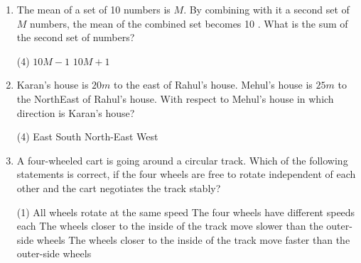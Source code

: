 \begin{enumerate}
\begin{tasks}
\end{tasks}
\item  The mean of a set of 10 numbers is $M$. By combining with it a second set of $M$ numbers, the mean of the combined set becomes 10 . What is the sum of the second set of numbers?
 \begin{tasks}(4)
	\task[\textbf{a.}]$10 M-1$
	\task[\textbf{b.}]$10 M+1$
\end{tasks}
\item Karan's house is $20 m$ to the east of Rahul's house. Mehul's house is $25 m$ to the NorthEast of Rahul's house. With respect to Mehul's house in which direction is Karan's house?
 \begin{tasks}(4)
	\task[\textbf{a.}]East
	\task[\textbf{b.}] South
	\task[\textbf{c.}]North-East
	\task[\textbf{d.}]  West
\end{tasks}
\item A four-wheeled cart is going around a circular track. Which of the following statements is correct, if the four wheels are free to rotate independent of each other and the cart negotiates the track stably?
 \begin{tasks}(1)
	\task[\textbf{a.}] All wheels rotate at the same speed
	\task[\textbf{b.}] The four wheels have different speeds each
	\task[\textbf{c.}]The wheels closer to the inside of the track move slower than the outer-side wheels
	\task[\textbf{d.}]The wheels closer to the inside of the track move faster than the outer-side wheels	 
\end{tasks}	

\end{enumerate}
